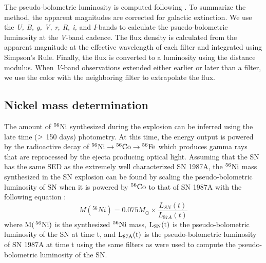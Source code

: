 \documentclass[a4paper,fleqn,usenatbib]{mnras}
\begin{document}
\indent The pseudo-bolometric luminosity is computed following \citet{2008valenti}.
To summarize the method, the apparent magnitudes are corrected for galactic extinction.
We use  the {\it U, B, g, V, r, R, i,} and {\it I}-bands to calculate the psuedo-bolometric luminosity at the {\it V}-band cadence.
The flux density is calculated from the apparent magnitude at the effective wavelength of each filter and integrated using Simpson's Rule. 
Finally, the flux is converted to a luminosity using the distance modulus. 
When {\it V}-band observations extended either earlier or later than a filter, we use the color with the neighboring filter to extrapolate the flux.
\subsection{Nickel mass determination}\label{Sec:Ni}
The amount of  $\rm{{}^{56}Ni}$ synthesized during the explosion can be inferred using the late time ($\rm{>}$ 150 days) photometry.
At this time, the energy output is powered by the radioactive decay of $\rm{{}^{56}Ni \rightarrow {}^{56}Co \rightarrow {}^{56}Fe}$ which produces gamma rays that are reprocessed by the ejecta producing optical light.
Assuming that the SN has the same SED as the extremely well characterized SN 1987A, the $\rm{{}^{56}Ni}$ mass synthesized in the SN explosion can be found by scaling the pseudo-bolometric luminosity of SN when it is powered by $\rm{{}^{56}Co}$ to that of SN 1987A with the following equation \citep{2014spiro}:
\begin{equation} \label{eqn:Ni}
M({}^{56}Ni) = 0.075M_{\odot} \times \frac{L_{SN}(t)}{L_{87A}(t)}
\end{equation}
where $\rm{M(\,{}^{56}Ni)}$ is the synthesized $\rm{{}^{56}Ni}$ mass, $\rm{L_{SN}(t)}$ is the pseudo-bolometric luminosity of the SN at time t, and $\rm{L_{87A}(t)}$ is the pseudo-bolometric luminosity of SN 1987A at time t using the same filters as were used to compute the pseudo-bolometric luminosity of the SN.
\end{document}
